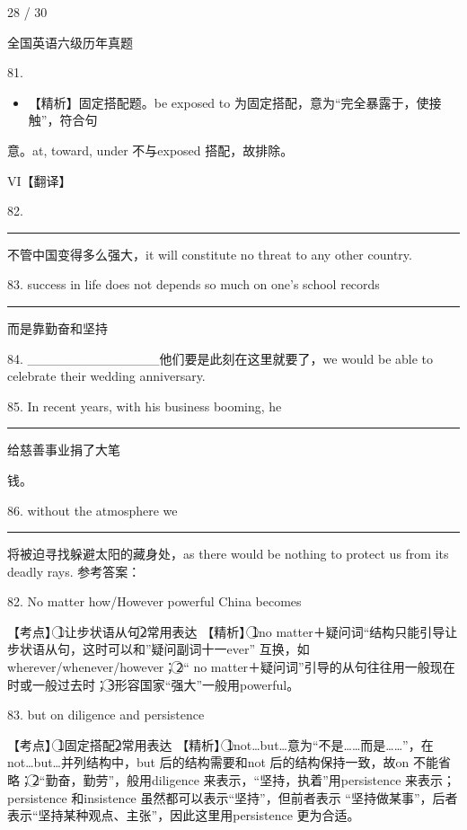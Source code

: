 \documentclass[UTF8,11pt]{ctexart}
\begin{document}
28 / 30


全国英语六级历年真题


81.


\begin{itemize}[leftmargin=2em,itemsep=.2em,topsep=.4em]\item[B.] 【精析】固定搭配题。be exposed to 为固定搭配，意为“完全暴露于，使接触”，符合句
\end{itemize}

意。at, toward, under 不与exposed 搭配，故排除。


VI【翻译】


82. \par\noindent\rule{.95\linewidth}{.4pt}\par 不管中国变得多么强大，it will constitute no threat to any other country.


83. success in life does not depends so much on one’s school records\par\noindent\rule{.95\linewidth}{.4pt}\par


而是靠勤奋和坚持


84. \_\_\_\_\_\_\_\_\_\_\_\_\_\_他们要是此刻在这里就要了，we would be able to celebrate their wedding anniversary.


85. In recent years, with his business booming, he \par\noindent\rule{.95\linewidth}{.4pt}\par 给慈善事业捐了大笔


钱。


86. without the atmosphere we\par\noindent\rule{.95\linewidth}{.4pt}\par 将被迫寻找躲避太阳的藏身处，as there would be nothing to protect us from its deadly rays. 参考答案：


82. No matter how/However powerful China becomes


【考点】\textcircled{1}让步状语从句\textcircled{2}常用表达 【精析】\textcircled{1}no matter＋疑问词“结构只能引导让步状语从句，这时可以和”疑问副词十一ever” 互换，如wherever/whenever/however；\textcircled{2}“ no matter＋疑问词”引导的从句往往用一般现在时或一般过去时；\textcircled{3}形容国家“强大”一般用powerful。


83. but on diligence and persistence


【考点】\textcircled{1}固定搭配\textcircled{2}常用表达 【精析】\textcircled{1}not…but…意为“不是……而是……”，在not…but…并列结构中，but 后的结构需要和not 后的结构保持一致，故on 不能省略；\textcircled{2}“勤奋，勤劳”，般用diligence 来表示，“坚持，执着”用persistence 来表示；persistence 和insistence 虽然都可以表示“坚持”，但前者表示 “坚持做某事”，后者表示“坚持某种观点、主张”，因此这里用persistence 更为合适。
\end{document}
